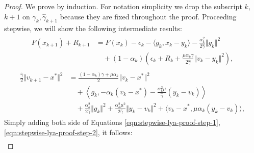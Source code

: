 \documentclass[12pt]{article}
\begin{document}
    \begin{proof}
        We prove by induction. 
        For notation simplicity we drop the subscript $k$, $k + 1$ on $\gamma_{k}, \hat \gamma_{k + 1}$ because they are fixed throughout the proof. 
        Proceeding stepwise, we will show the following intermediate results: 
        \begin{align}\tag{Step 1}\label{eqn:stepwise-lya-proof-step-1}
            \begin{split}
                F(x_{k + 1}) + R_{k + 1}
                &= 
                F(x_k) - \epsilon_k - \langle  g_k, x_k - y_k\rangle
                - \frac{\alpha_k^2}{2\hat \gamma}\Vert g_k\Vert^2
                \\
                &\quad 
                    + 
                    (1 - \alpha_k)
                    \left(
                        \epsilon_k + R_k + 
                        \frac{\mu\alpha_k\gamma}{2\hat \gamma}
                        \Vert v_k - y_k\Vert^2
                    \right), 
            \end{split}
        \end{align}
        \begin{align}\tag{Step 2}\label{eqn:stepwise-lya-proof-step-2}
            \begin{split}
                \frac{\hat \gamma}{2}\Vert v_{k + 1} - x^* \Vert^2 
                &=                 
                \frac{(1 - \alpha_k)\gamma + \mu \alpha_k}{2} \Vert v_k - x^*\Vert^2
                \\
                & \quad 
                    + 
                    \left\langle g_k, 
                        - \alpha_k(v_k - x^*) 
                        - \frac{\alpha_k^2\mu}{\hat \gamma}(y_k - v_k)
                    \right\rangle
                \\
                & \quad 
                    + \frac{\alpha_k^2}{2\hat \gamma}\Vert g_k\Vert^2
                    + \frac{\alpha_k^2 \mu^2}{2\hat \gamma}\Vert y_k - v_k\Vert^2
                    + \langle v_k - x^*, \mu\alpha_k(y_k - v_k)\rangle,     
            \end{split}
        \end{align}
        Simply adding both side of Equations \eqref{eqn:stepwise-lya-proof-step-1}, \eqref{eqn:stepwise-lya-proof-step-2}, it follows: 
        \begin{align}\tag{Step 3}\label{eqn:stepwise-lya-proof-step-3}

\end{align}
\end{proof}
\end{document}

